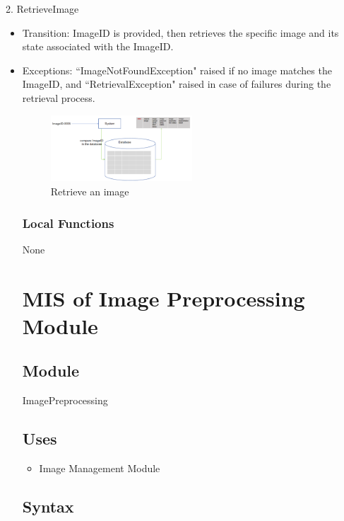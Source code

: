 \documentclass[12pt, titlepage]{article}
\begin{document}
2. RetrieveImage
\begin{itemize}
    \item Transition: ImageID is provided, then retrieves the specific image and its state associated with the ImageID.

    \item Exceptions: ``ImageNotFoundException" raised if no image matches the ImageID, and ``RetrievalException" raised in case of failures during the retrieval process.

\begin{figure}[H]
\centering
\includegraphics[width=0.5\textwidth]{3.png}
\caption{Retrieve an image}
\label{Fig2}
\end{figure}


\subsubsection{Local Functions}
None

\newpage

\section{MIS of Image Preprocessing Module} \label{m3} 

\subsection{Module}

ImagePreprocessing

\subsection{Uses}

\begin{itemize}
    \item Image Management Module
\end{itemize}

\subsection{Syntax}


\end{itemize}
\end{document}
